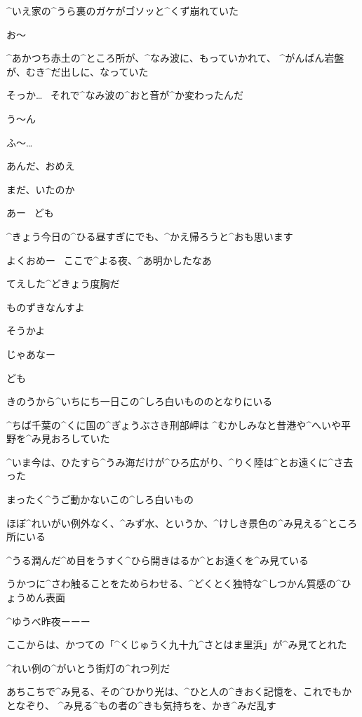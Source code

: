 \page
\Alpha ^{いえ}{家}の^{うら}{裏}のガケがゴソッと^{くず}{崩}れていた

\Alpha お〜

\Alpha ^{あかつち}{赤土}の^{ところ}{所}が、^{なみ}{波}に、もっていかれて、
^{がんばん}{岩盤}が、むき^{だ}{出}しに、なっていた

\Alpha そっか…
\ それで^{なみ}{波}の^{おと}{音}が^{か}{変}わったんだ

\Alpha う〜ん

\page
\Ayase ふ〜…

\page[121]
\Person あんだ、おめえ

\Person まだ、いたのか

\Ayase あー
\ ども

\page
\Ayase ^{きょう}{今日}の^{ひる}{昼}すぎにでも、^{かえ}{帰}ろうと^{おも}{思}います

\Person よくおめー
\ ここで^{よる}{夜}、^{あ}{明}かしたなあ

\Person てえした^{どきょう}{度胸}だ

\Ayase ものずきなんすよ

\Person そうかよ

\page
\Person じゃあなー

\Ayase ども

\page
\Ayase きのうから^{いちにち}{一日}この^{しろ}{白}いもののとなりにいる

\Ayase ^{ちば}{千葉}の^{くに}{国}の^{ぎょうぶさき}{刑部岬}は
^{むかしみなと}{昔港}や^{へいや}{平野}を^{み}{見}おろしていた

\Ayase ^{いま}{今}は、ひたすら^{うみ}{海}だけが^{ひろ}{広}がり、^{りく}{陸}は^{とお}{遠}くに^{さ}{去}った

\page
\Ayase まったく^{うご}{動}かないこの^{しろ}{白}いもの

\Ayase ほぼ^{れいがい}{例外}なく、^{みず}{水}、というか、^{けしき}{景色}の^{み}{見}える^{ところ}{所}にいる

\Ayase ^{うる}{潤}んだ^{め}{目}をうすく^{ひら}{開}きはるか^{とお}{遠}くを^{み}{見}ている

\Ayase うかつに^{さわ}{触}ることをためらわせる、^{どくとく}{独特}な^{しつかん}{質感}の^{ひょうめん}{表面}

\page
\Ayase ^{ゆうべ}{昨夜}ーーー

\Ayase ここからは、かつての「^{くじゅうく}{九十九}^{さとはま}{里浜}」が^{み}{見}てとれた

\Ayase ^{れい}{例}の^{がいとう}{街灯}の^{れつ}{列}だ

\page
\Ayase あちこちで^{み}{見}る、その^{ひかり}{光}は、^{ひと}{人}の^{きおく}{記憶}を、これでもかとなぞり、
^{み}{見}る^{もの}{者}の^{きも}{気持}ちを、かき^{みだ}{乱}す


